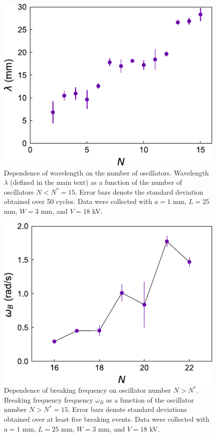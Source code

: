 \begin{appendices}
\begin{figure}[p]
    \centering
    \includegraphics{figures/A2_SI2.pdf}
    \caption{Dependence of wavelength on the number of oscillators. Wavelength $\lambda$ (defined in the main text) as a function of the number of oscillators $N<N^*=15$. Error bars denote the standard deviation obtained over 50 cycles.  Data  were collected with $a=1$ mm, $L=25$ mm, $W=3$ mm, and $V=18$ kV.}
    \label{fig:SI2}
\end{figure}

\begin{figure}[p]
    \centering
    \includegraphics{figures/A2_SI3.pdf}
    \caption{Dependence of breaking frequency on  oscillator number $N>N^*$. Breaking frequency frequency $\omega_B$ as a function of the oscillator number $N>N^*=15$. Error bars denote standard deviations obtained over at least five breaking events. Data  were collected with $a=1$ mm, $L=25$ mm, $W=3$ mm, and $V=18$ kV.}
    \label{fig:SI3}
\end{figure}



\end{appendices}
